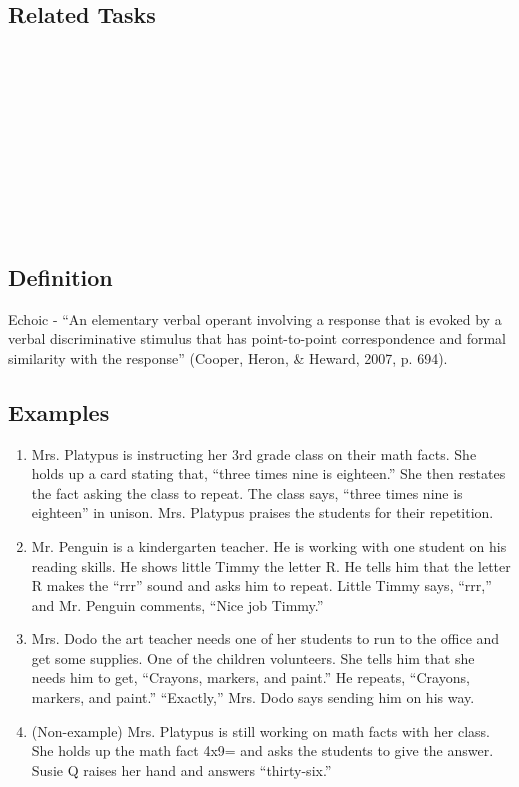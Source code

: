 \subsection{Related Tasks}
\fourdTen{}\\
\fourdEleven{}\\
\fourdTwelve{}\\
\fourdThirteen{}\\
\fourdFourteen{}\\
\fourFKFourtyThree{}\\
\fourFKFourtyFour{}\\
\fourFKFourtyFive{}\\
\fourFKFourtySix{}\\
%
\clearpage \section{\fourFKFourtyThree{}}
\subsection{Definition}  
Echoic - ``An elementary verbal operant involving a response that is evoked by a verbal discriminative stimulus that has point-to-point correspondence and formal similarity with the response'' (Cooper, Heron, \& Heward, 2007, p. 694).   
%
\subsection{Examples}
\begin{enumerate}
\item Mrs. Platypus is instructing her 3rd grade class on their math facts.  She holds up a card stating that, ``three times nine is eighteen.''  She then restates the fact asking the class to repeat.  The class says, ``three times nine is eighteen'' in unison.  Mrs. Platypus praises the students for their repetition.
\item Mr. Penguin is a kindergarten teacher.  He is working with one student on his reading skills.  He shows little Timmy the letter R.  He tells him that the letter R makes the ``rrr'' sound and asks him to repeat.  Little Timmy says, ``rrr,'' and Mr. Penguin comments, ``Nice job Timmy.''  
\item Mrs. Dodo the art teacher needs one of her students to run to the office and get some supplies. One of the children volunteers.  She tells him that she needs him to get, ``Crayons, markers, and paint.''  He repeats, ``Crayons, markers, and paint.''  ``Exactly,'' Mrs. Dodo says sending him on his way.  
\item (Non-example) Mrs. Platypus is still working on math facts with her class.  She holds up the math fact 4x9= and asks the students to give the answer.  Susie Q raises her hand and answers ``thirty-six.''  
%
\end{enumerate}
%
